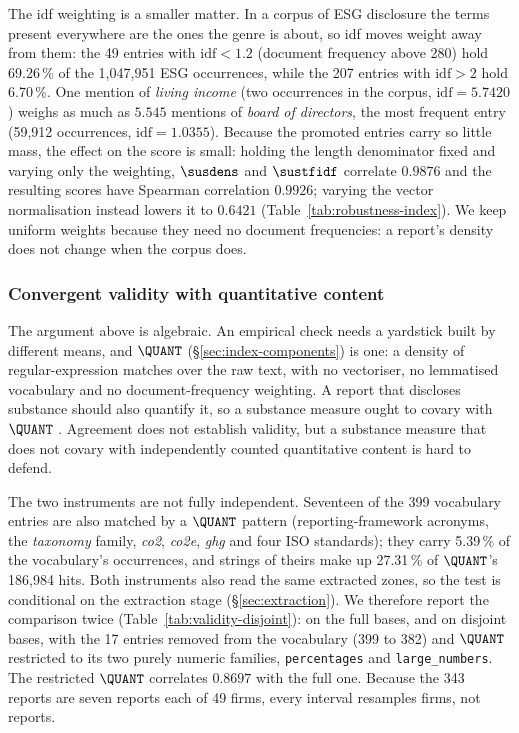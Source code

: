 The idf weighting is a smaller matter. In a corpus of ESG disclosure the terms
present everywhere are the ones the genre is about, so idf moves weight away
from them: the 49 entries with $\mathrm{idf} < 1.2$ (document frequency above
280) hold 69.26\,\% of the 1{,}047{,}951 ESG occurrences, while the 207
entries with $\mathrm{idf} > 2$ hold 6.70\,\%. One mention of \emph{living
income} (two occurrences in the corpus, $\mathrm{idf} = 5.7420$) weighs as much
as $5.545$ mentions of \emph{board of directors}, the most frequent entry
(59{,}912 occurrences, $\mathrm{idf} = 1.0355$). Because the promoted entries
carry so little mass, the effect on the score is small: holding the length
denominator fixed and varying only the weighting, $\susdens$ and $\sustfidf$
correlate $0.9876$ and the resulting scores have Spearman correlation
$0.9926$; varying the vector normalisation instead lowers it to $0.6421$
(Table~\ref{tab:robustness-index}). We keep uniform weights because they need no
document frequencies: a report's density does not change when the corpus
does.

\subsubsection{Convergent validity with quantitative content}
\label{sec:validity}

The argument above is algebraic. An empirical check needs a yardstick built
by different means, and $\QUANT$ (\S\ref{sec:index-components}) is one: a
density of regular-expression matches over the raw text, with no vectoriser,
no lemmatised vocabulary and no document-frequency weighting. A report that
discloses substance should also quantify it, so a substance measure ought to
covary with $\QUANT$ \citep{campbell1959}. Agreement does not establish
validity, but a substance measure that does not covary with independently
counted quantitative content is hard to defend.

The two instruments are not fully independent. Seventeen of the 399
vocabulary entries are also matched by a $\QUANT$ pattern (reporting-framework
acronyms, the \emph{taxonomy} family, \emph{co2}, \emph{co2e}, \emph{ghg} and
four ISO standards); they carry 5.39\,\% of the vocabulary's occurrences, and
strings of theirs make up 27.31\,\% of $\QUANT$'s 186{,}984 hits. Both
instruments also read the same extracted zones, so the test is conditional on
the extraction stage (\S\ref{sec:extraction}). We therefore report the
comparison twice (Table~\ref{tab:validity-disjoint}): on the full bases, and on
disjoint bases, with the 17 entries removed from the vocabulary (399 to 382)
and $\QUANT$ restricted to its two purely numeric families,
\texttt{percentages} and \texttt{large\_numbers}. The restricted $\QUANT$
correlates $0.8697$ with the full one. Because the 343 reports are seven
reports each of 49 firms, every interval resamples firms, not reports.

